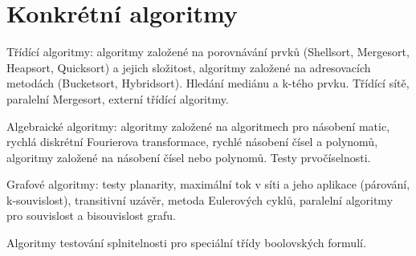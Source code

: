 \newpage
\section{Konkrétní algoritmy}
\begin{pozadavky}
\begin{pitemize}
\item Třídící algoritmy: algoritmy založené na porovnávání prvků (Shellsort, Mergesort, Heapsort, Quicksort) a jejich složitost, algoritmy založené na adresovacích metodách (Bucketsort, Hybridsort). Hledání mediánu a k-tého prvku. Třídící sítě, paralelní Mergesort, externí třídící algoritmy.
\item Algebraické algoritmy: algoritmy založené na algoritmech pro násobení matic, rychlá diskrétní Fourierova transformace, rychlé násobení čísel a polynomů, algoritmy založené na násobení čísel nebo polynomů. Testy prvočíselnosti.
\item Grafové algoritmy: testy planarity, maximální tok v síti a jeho aplikace (párování, k-souvislost), transitivní uzávěr, metoda Eulerových cyklů, paralelní algoritmy pro souvislost a bisouvislost grafu.
\item Algoritmy testování splnitelnosti pro speciální třídy boolovských formulí.
\end{pitemize}
\end{pozadavky}




